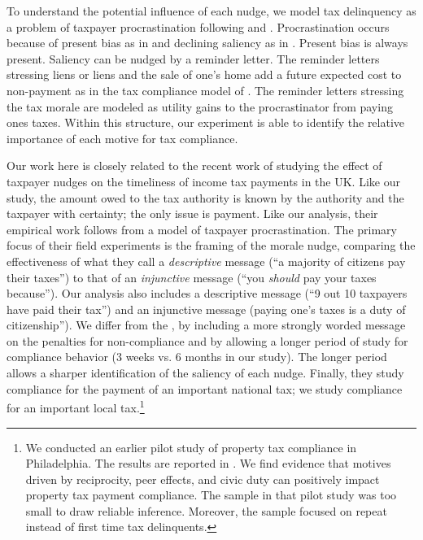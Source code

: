 \documentclass[12pt]{article}
\begin{document}
To understand the potential influence of each nudge, we model tax
delinquency as a problem of taxpayer procrastination following
 and .  Procrastination occurs 
because of present bias as in  and declining saliency as in
.  Present bias is always present.  Saliency can be
nudged by a reminder letter.  The reminder letters stressing liens or
liens and the sale of one's home add a future expected cost to
non-payment as in the tax compliance model of
.  The reminder letters stressing the tax
morale are modeled as utility gains to the procrastinator from paying
ones taxes.  Within this structure, our experiment is able to identify
the relative importance of each motive for tax compliance.

Our work here is closely related to the recent work of
 studying the effect of taxpayer nudges on the
timeliness of income tax payments in the UK.  Like our study, the
amount owed to the tax authority is known by the authority and the
taxpayer with certainty; the only issue is payment.  Like our
analysis, their empirical work follows from a model of taxpayer
procrastination.  The primary focus of their field experiments is the
framing of the morale nudge, comparing the effectiveness of what they
call a \textit{descriptive} message (``a majority of citizens pay
their taxes'') to that of an \textit{injunctive} message (``you
\textit{should} pay your taxes because'').  Our analysis also includes
a descriptive message (``9 out 10 taxpayers have paid their tax'') and
an injunctive message (paying one's taxes is a duty of citizenship'').
We differ from the , by including a more strongly
worded message on the penalties for non-compliance and by allowing a
longer period of study for compliance behavior (3 weeks vs. 6 months
in our study).  The longer period allows a sharper identification of
the saliency of each nudge.  Finally, they study compliance for the
payment of an important national tax; we study compliance for an
important local tax.\footnote{We conducted an earlier pilot study of
  property tax compliance in Philadelphia.  The results are reported
  in .  We find evidence that motives driven by
  reciprocity, peer effects, and civic duty can positively impact
  property tax payment compliance. The sample in that pilot study
  was too small to draw reliable inference. Moreover, the sample
  focused on repeat instead of first time tax delinquents.}
\end{document}

